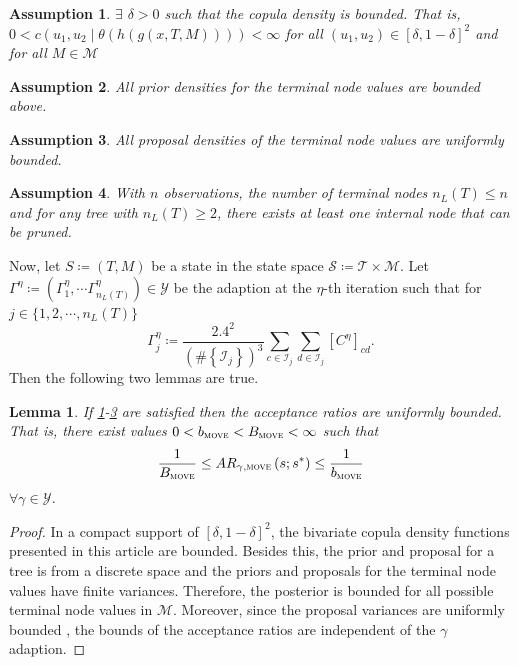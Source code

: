 \documentclass[
12pt]{article}
\newtheorem{lemma}{Lemma}[section]
\newtheorem{assumption}{Assumption}[section]
\begin{document}
	\begin{assumption}\label{ass:bounded:cop}
		$\exists$ \(\delta>0\) such that the copula density is bounded. That is, $0 < c(u_1,u_2\mid\theta(h(g(x,T,M)))) < \infty$ for all $(u_1,u_2)\in[\delta,1-\delta]^2$ and for all $M \in \mathcal{M}$
	\end{assumption}
	\begin{assumption}\label{ass:bounded:prior}
		All prior densities for the terminal node values are bounded above.
	\end{assumption}
	\begin{assumption}\label{ass:bounded:prop}
		All proposal densities of the terminal node values are uniformly bounded.
	\end{assumption}
	\begin{assumption}\label{ass:bounded:tree}
		With $n$ observations, the number of terminal nodes $n_L(T)\le n$ and for any tree with $n_L(T)\ge 2$, there exists at least one internal node that can be pruned.
	\end{assumption}
	
	
	Now, let $S\coloneqq \left(T,M\right)$ be a state in the state space $\mathcal{S}\coloneqq\mathcal{T}\times \mathcal{M}$. Let $\Gamma^{\eta} \coloneqq \left(\Gamma_{1}^{\eta}, \cdots\Gamma^{\eta}_{n_L(T)}\right)\in\mathcal{Y}$ be the adaption at the $\eta$-th iteration such that for $j \in \{1,2,\cdots, n_L(T)\}$
	\begin{equation*}
		\Gamma^{\eta}_{j} \coloneqq \frac{2.4^2}{\left(\#\left\{\mathcal{I}_{j}\right\}\right)^3}
		\sum_{c\in\mathcal{I}_{j}}\sum_{d\in\mathcal{I}_{j}}\left[C^{\eta}\right]_{cd}.
	\end{equation*}
	Then the following two lemmas are true.
	
	\begin{lemma}\label{lemm:bounded:ratio}
		If \cref{ass:bounded:cop}-\cref{ass:bounded:prop} are satisfied then the acceptance ratios are uniformly bounded. That is, there exist values $0< b_{\textsc{move}} <  B_{\textsc{move}} < \infty$ such that
		\begin{equation*}
			\frac{1}{B_{\textsc{move}}} \le AR_{\gamma, \textsc{move}}\left(s;s^{\ast}\right) \le \frac{1}{b_{\textsc{move}}}
		\end{equation*}
		$\forall\gamma \in \mathcal{Y}$.
	\end{lemma}
	
	\begin{proof}
		In a compact support of $[\delta,1-\delta]^2$, the bivariate copula density functions presented in this article are bounded. Besides this, the prior and proposal for a tree is from a discrete space and the priors and proposals for the terminal node values have finite variances. Therefore, the posterior is bounded for all possible terminal node values in $\mathcal{M}$. Moreover, since the proposal variances are uniformly bounded \citep{haario_AMH}, the bounds of the acceptance ratios are independent of the $\gamma$ adaption.
	\end{proof}
	
\end{document}
